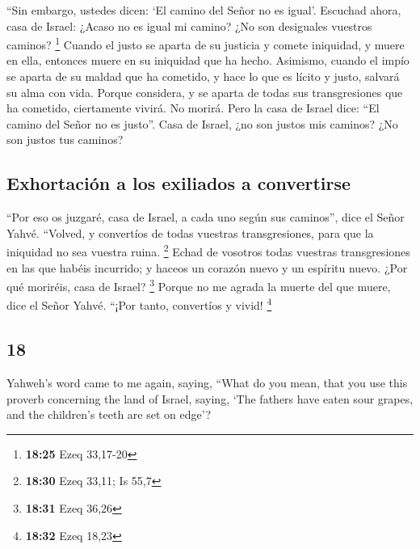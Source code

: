 \begin{paracol}{2}
 ``Sin embargo, ustedes dicen: `El camino del Señor no es
igual'. Escuchad ahora, casa de Israel: ¿Acaso no es igual mi camino?
¿No son desiguales vuestros caminos? \footnote{\textbf{18:25} Ezeq
  33,17-20}  Cuando el justo se aparta de su justicia y
comete iniquidad, y muere en ella, entonces muere en su iniquidad que ha
hecho.  Asimismo, cuando el impío se aparta de su maldad
que ha cometido, y hace lo que es lícito y justo, salvará su alma con
vida.  Porque considera, y se aparta de todas sus
transgresiones que ha cometido, ciertamente vivirá. No morirá.
 Pero la casa de Israel dice: ``El camino del Señor no es
justo''. Casa de Israel, ¿no son justos mis caminos? ¿No son justos tus
caminos?

\hypertarget{exhortaciuxf3n-a-los-exiliados-a-convertirse}{%
\subsection{Exhortación a los exiliados a
convertirse}\label{exhortaciuxf3n-a-los-exiliados-a-convertirse}}

 ``Por eso os juzgaré, casa de Israel, a cada uno según
sus caminos'', dice el Señor Yahvé. ``Volved, y convertíos de todas
vuestras transgresiones, para que la iniquidad no sea vuestra ruina.
\footnote{\textbf{18:30} Ezeq 33,11; Is 55,7}  Echad de
vosotros todas vuestras transgresiones en las que habéis incurrido; y
haceos un corazón nuevo y un espíritu nuevo. ¿Por qué moriréis, casa de
Israel? \footnote{\textbf{18:31} Ezeq 36,26}  Porque no
me agrada la muerte del que muere, dice el Señor Yahvé. ``¡Por tanto,
convertíos y vivid! \footnote{\textbf{18:32} Ezeq 18,23}

\switchcolumn
\begin{otherlanguage}{english}

\hypertarget{section-35}{%
\section{18}\label{section-35}}

 Yahweh's word came to me again, saying, 
``What do you mean, that you use this proverb concerning the land of
Israel, saying, `The fathers have eaten sour grapes, and the children's
teeth are set on edge'?


\end{otherlanguage}
\end{paracol}
